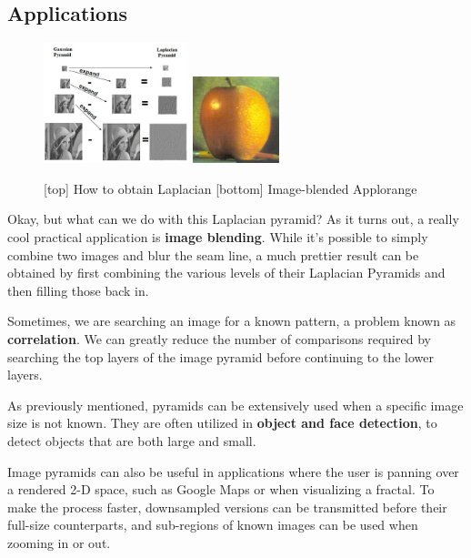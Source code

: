 \documentclass{article}
\begin{document}
\subsection{Applications}
\begin{figure}
  \begin{center}
    \vspace{-55pt}
    \includegraphics[width=0.375\textwidth]{pyramids.png}
    \hspace{5pt}
    \includegraphics[width=0.225\textwidth]{blended.jpg}
    \vspace{-15pt}
  \end{center}
  \caption{[top] How to obtain Laplacian [bottom] Image-blended Applorange}
  \vspace{-20pt}
\end{figure}

Okay, but what can we do with this Laplacian pyramid? As it turns out, a really cool practical application is \textbf{image blending}. While it's possible to simply combine two images and blur the seam line, a much prettier result can be obtained by first combining the various levels of their Laplacian Pyramids and then filling those back in.

Sometimes, we are searching an image for a known pattern, a problem known as \textbf{correlation}. We can greatly reduce the number of comparisons required by searching the top layers of the image pyramid before continuing to the lower layers.

As previously mentioned, pyramids can be extensively used when a specific image size is not known. They are often utilized in \textbf{object and face detection}, to detect objects that are both large and small.

Image pyramids can also be useful in applications where the user is panning over a rendered 2-D space, such as Google Maps or when visualizing a fractal. To make the process faster, downsampled versions can be transmitted before their full-size counterparts, and sub-regions of known images can be used when zooming in or out.
\end{document}
